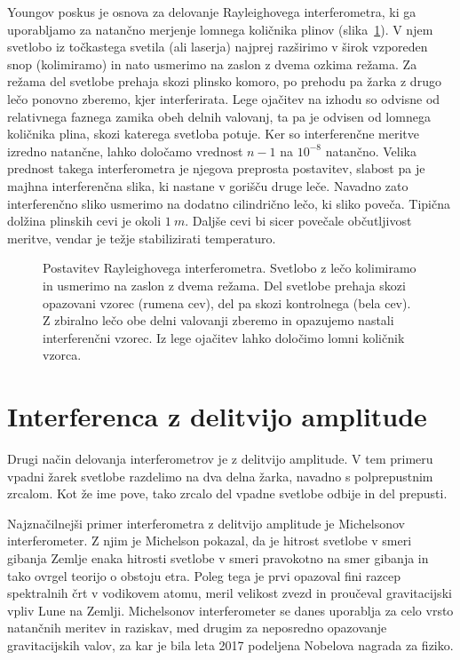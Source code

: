 \begin{remark}
Youngov poskus je osnova za delovanje Rayleighovega interferometra, ki ga uporabljamo
za natančno merjenje lomnega količnika plinov (slika~\ref{fig:06_RayleighInt}). V njem svetlobo
iz točkastega svetila (ali laserja) najprej razširimo v širok vzporeden snop (kolimiramo)
in nato usmerimo na zaslon z dvema ozkima režama. Za režama del svetlobe prehaja skozi plinsko komoro, 
po prehodu pa žarka z drugo lečo ponovno zberemo, kjer interferirata. Lege ojačitev na izhodu 
so odvisne od relativnega faznega zamika obeh delnih valovanj, ta pa je odvisen od
lomnega količnika plina, skozi katerega svetloba potuje. Ker so interferenčne
meritve izredno natančne, lahko določamo vrednost $n-1$ na $10^{-8}$ natančno. Velika
prednost takega interferometra je njegova preprosta postavitev, slabost pa je majhna
interferenčna slika, ki nastane v gorišču druge leče. Navadno zato interferenčno sliko 
usmerimo na dodatno cilindrično lečo, ki sliko poveča. Tipična dolžina plinskih cevi je okoli
$1~\si{m}$. Daljše cevi bi sicer povečale občutljivost meritve, vendar je težje
stabilizirati temperaturo.

\begin{figure}[ht]
\centering
\def\svgwidth{100truemm} 

\caption{Postavitev Rayleighovega interferometra. Svetlobo z lečo kolimiramo in 
usmerimo na zaslon z dvema režama. Del svetlobe prehaja skozi opazovani vzorec (rumena cev), del 
pa skozi kontrolnega (bela cev). Z zbiralno lečo obe delni valovanji zberemo in opazujemo
nastali interferenčni vzorec. Iz lege ojačitev lahko določimo lomni količnik
vzorca.}
\label{fig:06_RayleighInt}
\end{figure}
\end{remark}

\section{Interferenca z delitvijo amplitude}
\label{chap:Michelson}
Drugi način delovanja interferometrov je z delitvijo amplitude. V tem primeru
vpadni žarek svetlobe razdelimo na dva delna žarka, navadno s polprepustnim zrcalom. 
Kot že ime pove, tako zrcalo del vpadne svetlobe odbije in del prepusti.

Najznačilnejši primer interferometra z delitvijo amplitude je Michelsonov 
interferometer.
Z njim je Michelson pokazal, da je hitrost svetlobe v smeri gibanja Zemlje enaka hitrosti
svetlobe v smeri pravokotno na smer gibanja in tako ovrgel teorijo o obstoju etra. Poleg
tega je prvi opazoval fini razcep spektralnih črt v vodikovem atomu, meril velikost zvezd in 
proučeval gravitacijski vpliv Lune na Zemlji. Michelsonov interferometer
se danes uporablja za celo vrsto natančnih meritev in raziskav, med drugim za neposredno opazovanje 
gravitacijskih valov, za kar je bila leta 2017 podeljena Nobelova nagrada za fiziko.

